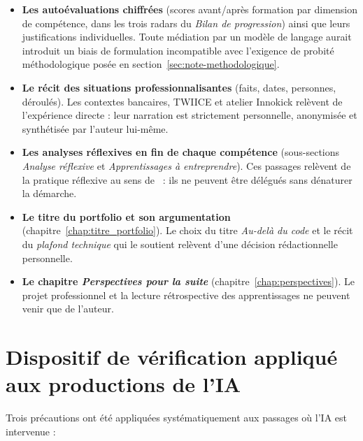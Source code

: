 \begin{itemize}
  \item \textbf{Les autoévaluations chiffrées} (scores avant/après formation par dimension de compétence, dans les trois radars du \emph{Bilan de progression}) ainsi que leurs justifications individuelles. Toute médiation par un modèle de langage aurait introduit un biais de formulation incompatible avec l'exigence de probité méthodologique posée en section~\ref{sec:note-methodologique}.
  \item \textbf{Le récit des situations professionnalisantes} (faits, dates, personnes, déroulés). Les contextes bancaires, TWIICE et atelier Innokick relèvent de l'expérience directe : leur narration est strictement personnelle, anonymisée et synthétisée par l'auteur lui-même.
  \item \textbf{Les analyses réflexives en fin de chaque compétence} (sous-sections \emph{Analyse réflexive} et \emph{Apprentissages à entreprendre}). Ces passages relèvent de la pratique réflexive au sens de~\citet{schon1994} : ils ne peuvent être délégués sans dénaturer la démarche.
  \item \textbf{Le titre du portfolio et son argumentation} (chapitre~\ref{chap:titre_portfolio}). Le choix du titre \emph{Au-delà du code} et le récit du \emph{plafond technique} qui le soutient relèvent d'une décision rédactionnelle personnelle.
  \item \textbf{Le chapitre \emph{Perspectives pour la suite}} (chapitre~\ref{chap:perspectives}). Le projet professionnel et la lecture rétrospective des apprentissages ne peuvent venir que de l'auteur.
\end{itemize}

\section{Dispositif de vérification appliqué aux productions de l'IA}

Trois précautions ont été appliquées systématiquement aux passages où l'IA est intervenue :

